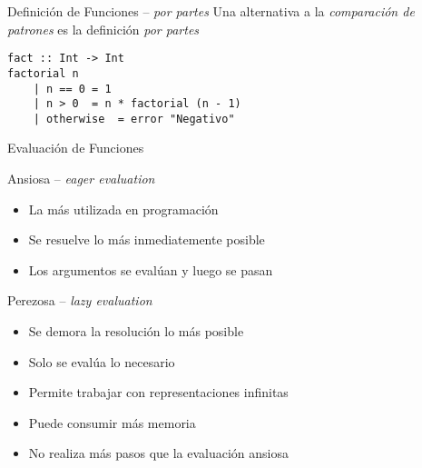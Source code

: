 \begin{frame}[fragile]{Definición de Funciones -- \emph{por partes}}
    Una alternativa a la \emph{comparación de patrones} es la definición \emph{por partes}
    \begin{lstlisting}[style=consola]
fact :: Int -> Int
factorial n
    | n == 0 = 1
    | n > 0  = n * factorial (n - 1)
    | otherwise  = error "Negativo"
    \end{lstlisting}
\end{frame}

\begin{frame}[fragile]{Evaluación de Funciones}
    \begin{block}{Ansiosa -- \emph{eager evaluation}}
        \begin{itemize}
            \item La más utilizada en programación
            \item Se resuelve lo más inmediatemente posible
            \item Los argumentos se evalúan y luego se pasan
        \end{itemize}
    \end{block}
    \begin{block}{Perezosa -- \emph{lazy evaluation}}
        \begin{itemize}
            \item Se demora la resolución lo más posible
            \item Solo se evalúa lo necesario
            \item Permite trabajar con representaciones infinitas
            \item Puede consumir más memoria
            \item No realiza más pasos que la evaluación ansiosa
        \end{itemize}
    \end{block}
\end{frame}


